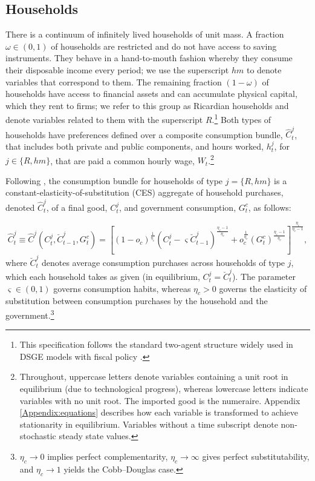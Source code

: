 \documentclass[12pt]{article}
\begin{document}
{\normalsize \label{sec:model}}

\subsection{Households}

There is a continuum of infinitely lived households of unit mass. A fraction $\omega\in (0,1)$ of households are restricted and do not have access to saving instruments. They behave in a hand-to-mouth fashion whereby they consume their disposable income every period; we use the superscript $hm$ to denote variables that correspond to them. The remaining fraction $(1-\omega)$ of households have access to financial assets and can accumulate physical capital, which they rent to firms; we refer to this group as Ricardian households and denote variables related to them with the superscript $R$.\footnote{This specification follows the standard two-agent structure widely used in DSGE models with fiscal policy \citep[e.g.][]{coenen2005does, gali2007understanding}.} Both types of households have preferences defined over a composite consumption bundle, $\hat{C}^j_{t}$, that includes both private and public components, and hours worked, $h^j_{t}$, for $j\in\{R,hm\}$, that are paid a common hourly wage, $W_t$.\footnote{Throughout, uppercase letters denote variables containing a unit root in equilibrium (due to technological progress), whereas lowercase letters indicate variables with no unit root. The imported good is the numeraire. Appendix \ref{Appendix:equations} describes how each variable is transformed to achieve stationarity in equilibrium. Variables without a time subscript denote non-stochastic steady state values.}

Following \citet{coenen2013gauging}, the consumption bundle for households of type $j=\{R,hm\}$ is a constant-elasticity-of-substitution (CES) aggregate of household purchases, denoted $\hat{C}_t^j$, of a final good, $C_t^j$, and government consumption, $G_t^c$, as follows:

\begin{equation*}
\hat{C}_t^j \equiv \hat{C}^j(C_t^j,\breve{C}_{t-1}^j,G_t^c)= \left[(1-o_c)^{\frac{1}{\eta_c}}\left(C_t^j-\varsigma \breve{C}_{t-1}^j\right)^{\frac{\eta_c-1}{\eta_c}}+o_c^{\frac{1}{\eta_c}}\left(G_t^c\right)^{\frac{\eta_c-1}{\eta_c}}\right]^{\frac{\eta_c}{\eta_c-1}},
\end{equation*}
where $\breve{C}_t^j$ denotes average consumption purchases across households of type $j$, which each household takes as given (in equilibrium, $ C_t^j=\breve{C}_t^j$). The parameter $\varsigma\in (0,1)$ governs consumption habits, whereas $\eta_c>0$ governs the elasticity of substitution between consumption purchases by the household and the government.\footnote{$\eta_c \to 0$ implies perfect complementarity, $\eta_c \to \infty$ gives perfect substitutability, and $\eta_c \to 1$ yields the Cobb–Douglas case.}
\end{document}

